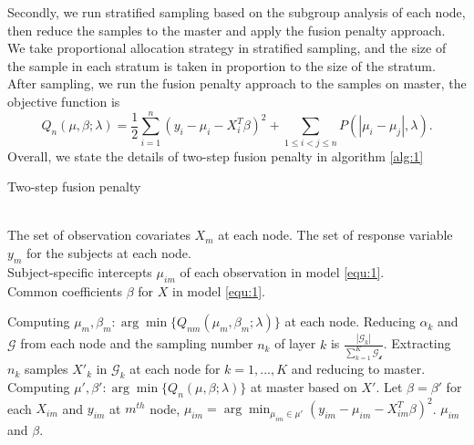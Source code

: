 \documentclass[review]{elsarticle}
\begin{document}
Secondly, we run stratified sampling based on the subgroup analysis of each node, then reduce the samples to the master and apply the fusion penalty approach. We take proportional allocation strategy in stratified sampling, and the size of the sample in each stratum is taken in proportion to the size of the stratum. After sampling, we run the fusion penalty approach to the samples on master, the objective function is
\begin{equation}
\label{equ:6}
Q_n(\mu,\beta;\lambda) = \frac{1}{2}\sum_{i=1}^n(y_i-\mu_i-X_i^T\beta)^2+\sum_{1\leq i<j\leq n}P(|\mu_i-\mu_j|,\lambda).
\end{equation}
Overall, we state the details of two-step fusion penalty in algorithm \ref{alg:1}
\begin{algorithm}
\caption{Two-step fusion penalty}
\label{alg:1}
\begin{algorithmic}[1]
\REQUIRE ~~\\
The set of observation covariates $X_m$ at each node.
The set of response variable $y_m$ for the subjects at each node.
\ENSURE ~~\\
Subject-specific intercepts $\mu_{im}$ of each observation in model \ref{equ:1}.\\
Common coefficients $\beta$ for $X$ in model \ref{equ:1}.

\STATE Computing $\mu_m,\beta_m: \arg\min\{Q_{nm}(\mu_m, \beta_m;\lambda)\}$ at each node.
\label{step:1}
\STATE Reducing $\alpha_k$ and $\mathcal{G}$ from each node and the sampling number $n_k$ of layer $k$ is $ \frac{|\mathcal{G}_k|}{\sum_{k=1}^{K}\mathcal{G_k}}$.
\label{step:2}
\STATE Extracting $n_k$ samples $X'_k$ in $\mathcal{G}_k$ at each node for $k=1,...,K$ and reducing to master.
\label{step:3}
\STATE Computing $\mu',\beta':\arg\min\{Q_n(\mu,\beta;\lambda)\}$ at master based on $X'$.
\STATE Let $\beta=\beta'$ for each $X_{im}$ and $y_{im}$ at $m^{th}$ node, $\mu_{im}=\arg\min_{\mu_{im}\in\mu'}(y_{im}-\mu_{im}-X_{im}^T\beta)^2$.
\RETURN $\mu_{im}$ and $\beta$.
\end{algorithmic}
\end{algorithm}
\end{document}
